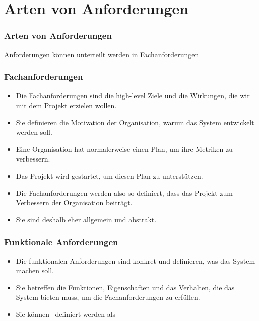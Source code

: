 \documentclass[aspectratio=169,mathserif,notheorems]{beamer}%
\begin{document}
\section{Arten von Anforderungen}%
%
\begin{frame}%
\frametitle{Arten von Anforderungen}%
Anforderungen können unterteilt werden in Fachanforderungen\only<-1>{.}%
\end{frame}%
%
\begin{frame}%
\frametitle{Fachanforderungen}%
\begin{itemize}%
\item Die Fachanforderungen sind die high-level Ziele und die Wirkungen, die wir mit dem Projekt erzielen wollen.%
%
\item<2-> Sie definieren die Motivation der Organisation, warum das System entwickelt werden soll\cite{ISOIECIEEE2018SASELCPRE}.%
%
\item<3-> Eine Organisation hat normalerweise einen Plan, um ihre Metriken zu verbessern.%
%
\item<4-> Das Projekt wird gestartet, um diesen Plan zu unterstützen.%
%
\item<5-> Die Fachanforderungen werden also so definiert, dass das Projekt zum Verbessern der Organisation beiträgt.%
%
\item<6-> Sie sind deshalb eher allgemein und abstrakt.%
\end{itemize}%
\end{frame}%
%
\begin{frame}%
\frametitle{Funktionale Anforderungen}%
%
\begin{itemize}%
\item Die funktionalen Anforderungen sind konkret und definieren, was das System machen soll.%
%
\item<2-> Sie betreffen die Funktionen, Eigenschaften und das Verhalten, die das System bieten muss, um die Fachanforderungen zu erfüllen.%
%
\item<3-> Sie können \DEzB\ definiert werden als%
\end{itemize}%
\end{frame}%
\end{document}

